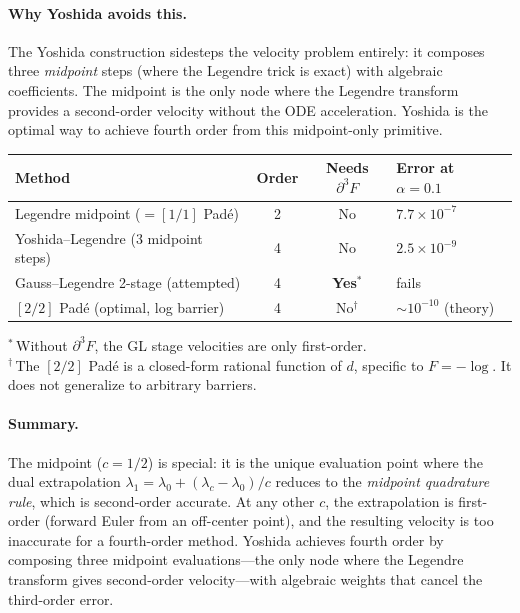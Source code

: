 \documentclass[11pt]{article}
\begin{document}
\paragraph{Why Yoshida avoids this.}
The Yoshida construction sidesteps the velocity problem entirely:
it composes three \emph{midpoint} steps (where the Legendre trick is
exact) with algebraic coefficients.  The midpoint is the only node
where the Legendre transform provides a second-order velocity without
the ODE acceleration.  Yoshida is the optimal way to achieve fourth
order from this midpoint-only primitive.

\begin{center}
\renewcommand{\arraystretch}{1.2}
\begin{tabular}{@{}lccl@{}}
\toprule
\textbf{Method} & \textbf{Order} & \textbf{Needs $\partial^3 F$} & \textbf{Error at $\alpha = 0.1$} \\
\midrule
Legendre midpoint ($= [1/1]$ Pad\'e) & 2 & No & $7.7 \times 10^{-7}$ \\
Yoshida--Legendre (3 midpoint steps) & 4 & No & $2.5 \times 10^{-9}$ \\
Gauss--Legendre 2-stage (attempted) & 4 & \textbf{Yes}${}^*$ & fails \\
\midrule
$[2/2]$ Pad\'e (optimal, log barrier) & 4 & No${}^\dagger$ & $\sim\!10^{-10}$ (theory) \\
\bottomrule
\end{tabular}
\end{center}
\noindent
${}^*$\,Without $\partial^3 F$, the GL stage velocities are only first-order. \\
${}^\dagger$\,The $[2/2]$ Pad\'e is a closed-form rational function of $d$,
specific to $F = -\log$.  It does not generalize to arbitrary barriers.

\paragraph{Summary.}
The midpoint ($c = 1/2$) is special: it is the unique evaluation point
where the dual extrapolation $\lambda_1 = \lambda_0 + (\lambda_c - \lambda_0)/c$
reduces to the \emph{midpoint quadrature rule}, which is second-order
accurate.  At any other $c$, the extrapolation is first-order (forward
Euler from an off-center point), and the resulting velocity is too
inaccurate for a fourth-order method.  Yoshida achieves fourth order
by composing three midpoint evaluations---the only node where the
Legendre transform gives second-order velocity---with algebraic
weights that cancel the third-order error.
\end{document}
